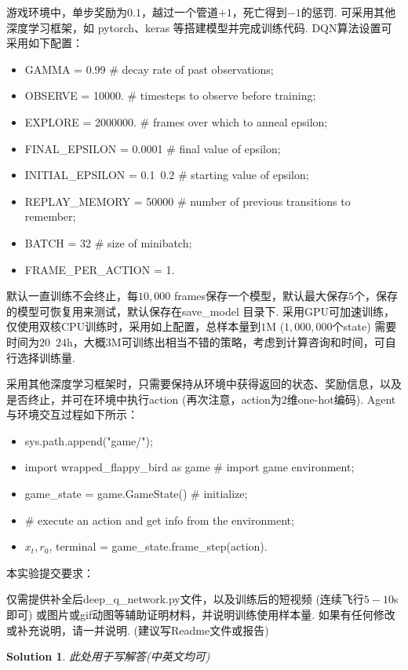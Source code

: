 \documentclass[a4paper,UTF8]{article}
\numberwithin{equation}{section}
\newtheorem*{mySol}{Solution}
\begin{document}
游戏环境中，单步奖励为$0.1$，越过一个管道$+1$，死亡得到$-1$的惩罚. 可采用其他深度学习框架，如 pytorch、keras 等搭建模型并完成训练代码. DQN算法设置可采用如下配置：
\begin{itemize}
	\item GAMMA = 0.99 \# decay rate of past observations;
	\item OBSERVE = 10000. \# timesteps to observe before training;
	\item EXPLORE = 2000000. \# frames over which to anneal epsilon;
	\item FINAL\_EPSILON = 0.0001 \# final value of epsilon;
	\item INITIAL\_EPSILON = 0.1~0.2 \# starting value of epsilon;
	\item REPLAY\_MEMORY = 50000 \# number of previous transitions to remember;
	\item BATCH = 32 \# size of minibatch;
	\item FRAME\_PER\_ACTION = 1.
\end{itemize}

默认一直训练不会终止，每$10,000$ frames保存一个模型，默认最大保存$5$个，保存的模型可恢复用来测试，默认保存在save\_model 目录下. 采用GPU可加速训练，仅使用双核CPU训练时，采用如上配置，总样本量到$1$M ($1,000,000$个state) 需要时间为$20$~$24$h，大概$3$M可训练出相当不错的策略，考虑到计算咨询和时间，可自行选择训练量.

采用其他深度学习框架时，只需要保持从环境中获得返回的状态、奖励信息，以及是否终止，并可在环境中执行action (再次注意，action为$2$维one-hot编码). Agent与环境交互过程如下所示：
\begin{itemize}
	\item sys.path.append("game/");
	\item import wrapped\_flappy\_bird as game \# import game environment;
	\item game\_state = game.GameState() \# initialize;
	\item \# execute an action and get info from the environment;
	\item $x_t, r_0$, terminal = game\_state.frame\_step(action).
\end{itemize}

本实验提交要求：

仅需提供补全后deep\_q\_network.py文件，以及训练后的短视频 (连续飞行$5-10$s 即可) 或图片或gif动图等辅助证明材料，并说明训练使用样本量. 如果有任何修改或补充说明，请一并说明. (建议写Readme文件或报告)



\begin{mySol}
此处用于写解答(中英文均可)

\end{mySol}
\newpage




\end{document}
